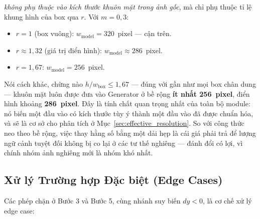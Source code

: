 \noindent \textit{không phụ thuộc vào kích thước khuôn mặt trong ảnh gốc}, mà chỉ phụ thuộc tỉ lệ khung hình của box qua $r$. Với $m = 0{,}3$:
\begin{itemize}
    \item $r = 1$ (box vuông): $w_{\text{model}} = 320$~pixel --- cận trên.
    \item $r \approx 1{,}32$ (giá trị điển hình): $w_{\text{model}} \approx 286$~pixel.
    \item $r = 1{,}67$: $w_{\text{model}} = 256$~pixel.
\end{itemize}

Nói cách khác, chừng nào $h / w_{\text{box}} \leq 1{,}67$ --- đúng với gần như mọi box chân dung --- khuôn mặt luôn được đưa vào Generator ở bề rộng \textbf{ít nhất 256~pixel}, điển hình khoảng \textbf{286~pixel}. Đây là tính chất quan trọng nhất của toàn bộ module: nó biến một đầu vào có kích thước tùy ý thành một đầu vào đã được chuẩn hóa, và sẽ là cơ sở cho phân tích ở Mục~\ref{sec:effective_resolution}. So với công thức neo theo bề rộng, việc thay hằng số bằng một dải hẹp là cái giá phải trả để lượng ngữ cảnh tuyệt đối không bị co lại ở các tư thế nghiêng --- đánh đổi có lợi, vì chính nhóm ảnh nghiêng mới là nhóm khó nhất.

\subsection{Xử lý Trường hợp Đặc biệt (Edge Cases)}
\label{subsec:edge_cases}

Các phép chặn ở Bước 3 và Bước 5, cùng nhánh suy biến $dy < 0$, là cơ chế xử lý edge case:

